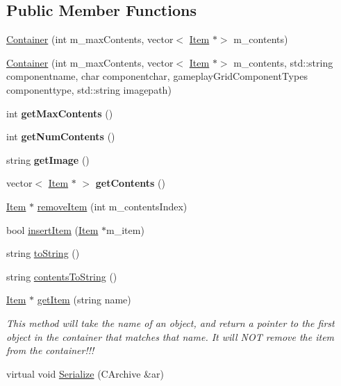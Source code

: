 \subsection*{Public Member Functions}
\begin{DoxyCompactItemize}
\item 
\hyperlink{class_container_adf46b339e71f73d1b29ba0ba628477d9}{Container} (int m\+\_\+max\+Contents, vector$<$ \hyperlink{class_item}{Item} $\ast$$>$ m\+\_\+contents)
\item 
\hyperlink{class_container_ab7f8067097f7f58cb1b251069af3c8ad}{Container} (int m\+\_\+max\+Contents, vector$<$ \hyperlink{class_item}{Item} $\ast$$>$ m\+\_\+contents, std\+::string componentname, char componentchar, gameplay\+Grid\+Component\+Types componenttype, std\+::string imagepath)
\item 
\hypertarget{class_container_a3edf03e1eca2c48a22bc6073efb6ab5c}{}\label{class_container_a3edf03e1eca2c48a22bc6073efb6ab5c} 
int {\bfseries get\+Max\+Contents} ()
\item 
\hypertarget{class_container_a9f10a0e0db5965080c21f290faee29b0}{}\label{class_container_a9f10a0e0db5965080c21f290faee29b0} 
int {\bfseries get\+Num\+Contents} ()
\item 
\hypertarget{class_container_a31016cf32f3c5cee711504ccc461b336}{}\label{class_container_a31016cf32f3c5cee711504ccc461b336} 
string {\bfseries get\+Image} ()
\item 
\hypertarget{class_container_a2215a87d003e88bab9a86a97a69448ac}{}\label{class_container_a2215a87d003e88bab9a86a97a69448ac} 
vector$<$ \hyperlink{class_item}{Item} $\ast$ $>$ {\bfseries get\+Contents} ()
\item 
\hyperlink{class_item}{Item} $\ast$ \hyperlink{class_container_a8b203900fe9babebd7e744e34321962c}{remove\+Item} (int m\+\_\+contents\+Index)
\item 
bool \hyperlink{class_container_a512e6e65360249dc2fcd1aa5f466a01e}{insert\+Item} (\hyperlink{class_item}{Item} $\ast$m\+\_\+item)
\item 
string \hyperlink{class_container_a2bedbb656854553ca7d22e9212a628fc}{to\+String} ()
\item 
string \hyperlink{class_container_ab00aa23e1f650444e153301a7a247116}{contents\+To\+String} ()
\item 
\hyperlink{class_item}{Item} $\ast$ \hyperlink{class_container_a0a7c5bb0533b6a28ae6b5f0736d75d30}{get\+Item} (string name)
\begin{DoxyCompactList}\small\item\em This method will take the name of an object, and return a pointer to the first object in the container that matches that name. It will N\+OT remove the item from the container!!! \end{DoxyCompactList}\item 
virtual void \hyperlink{class_container_ac274312989a3c896c3d764e2d315dfb7}{Serialize} (C\+Archive \&ar)
\end{DoxyCompactItemize}
